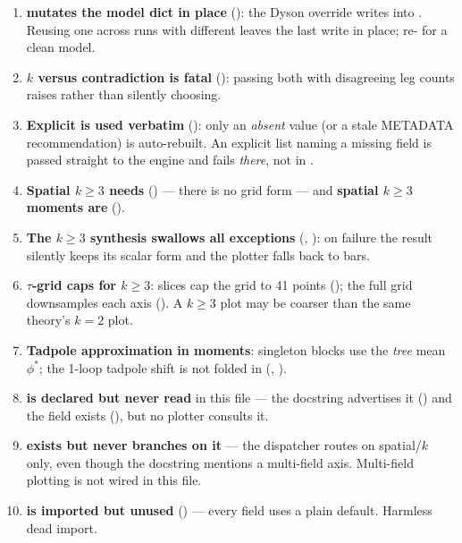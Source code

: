 \begin{enumerate}
  \item \textbf{ mutates the model dict in place}
        (): the Dyson override writes into
        . Reusing one  across runs with
        different  leaves the last write in place;
        re- for a clean model.
  \item \textbf{$k$ versus  contradiction is fatal}
        (): passing both with disagreeing leg
        counts raises rather than silently choosing.
  \item \textbf{Explicit  is used verbatim}
        (): only an \emph{absent} value (or a
        stale METADATA recommendation) is auto-rebuilt. An explicit list naming a
        missing field is passed straight to the engine and fails \emph{there}, not
        in .
  \item \textbf{Spatial $k\ge 3$ needs }
        () --- there is no grid form --- and
        \textbf{spatial $k\ge 3$ moments are }
        ().
  \item \textbf{The $k\ge 3$ synthesis swallows all exceptions}
        (, ): on failure the result
        silently keeps its scalar form and the plotter falls back to bars.
  \item \textbf{$\tau$-grid caps for $k\ge 3$}: slices cap the grid to 41 points
        (); the full grid downsamples each
        axis (). A $k\ge 3$ plot may be coarser than the same theory's
        $k=2$ plot.
  \item \textbf{Tadpole approximation in moments}: singleton blocks use the
        \emph{tree} mean $\phi^{*}$; the 1-loop tadpole shift is not folded in
        (, ).
  \item \textbf{ is declared but never read} in this file
        --- the docstring advertises it () and
        the field exists (), but no plotter consults it.
  \item \textbf{ exists but  never
        branches on it} --- the dispatcher routes on spatial/$k$ only, even though
        the docstring mentions a multi-field axis. Multi-field plotting is not
        wired in this file.
  \item \textbf{ is imported but
        unused} () --- every  field
        uses a plain default. Harmless dead import.
\end{enumerate}

